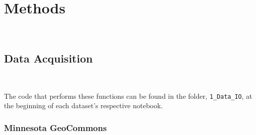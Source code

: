 \documentclass[article,12pt]{article}
\numberwithin{equation}{section}
\begin{document}
\section{Methods}
\begin{adjustwidth}{-.88in}{-.88in}
	\begin{center}
\\

\end{center}
\end{adjustwidth}
\vspace{.5in}

\subsection{Data Acquisition}
\begin{adjustwidth}{-.88in}{-.88in}
	\begin{center}
		\\
		
	\end{center}
\end{adjustwidth}
\vspace{.5in}

The code that performs these functions can be found in the folder, \texttt{1\_Data\_IO}, at the beginning of each dataset's respective notebook.

\subsubsection{Minnesota GeoCommons}
\end{document}
